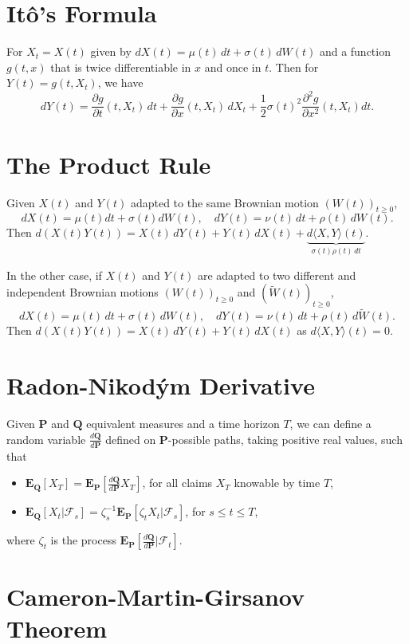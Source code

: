 \documentclass[twocolumn]{amsart}
\renewcommand{\P}{\mathbf{P}}
\newcommand{\Q}{\mathbf{Q}}
\newcommand{\EP}{\mathbf{E}_\mathbf{P}}
\newcommand{\EQ}{\mathbf{E}_\mathbf{Q}}
\newcommand{\F}{\mathcal{F}}
\newcommand{\QV}[1]{\langle#1\rangle}
\newcommand{\tW}{\widetilde W}
\begin{document}
\section*{It\^o's Formula}
For $X_t=X(t)$ given by $dX(t) = \mu(t)\,dt + \sigma(t)\,dW(t)$ and a function $g(t,x)$ that is twice differentiable in $x$ and once in $t$. Then for $Y(t) = g(t,X_t)$, we have
\[
dY(t) = \frac{\partial g}{\partial t}(t,X_t)\,dt + \frac{\partial g}{\partial x}(t,X_t)\,dX_t + \frac{1}{2} \sigma(t)^2 \frac{\partial ^2 g}{\partial x^2}(t,X_t)dt.
\]

\section*{The Product Rule}
Given $X(t)$ and $Y(t)$ adapted to the same Brownian motion $(W(t))_{t \ge 0}$,
\[
    dX(t) = \mu(t)dt +\sigma(t)dW(t), \quad
    dY(t) = \nu(t)\,dt + \rho(t)\,dW(t).
\]
Then $d(X(t) Y(t)) = X(t)\,d Y(t) + Y(t)\,dX(t) + \underbrace{d\QV{X,Y}(t)}_{\sigma(t) \rho(t)\,dt}$.

In the other case, if $X(t)$ and $Y(t)$ are adapted to two different and independent Brownian motions $(W(t))_{t \ge 0} $ and $(\tW(t))_{t \ge 0}$,
\[
    dX(t) =  \mu(t)\,dt + \sigma(t) \,dW(t), \quad
    dY(t) =  \nu(t)\,dt + \rho(t)\,d\tW(t).
\]
Then $d(X(t) Y(t)) = X(t) \,dY(t) + Y(t)\,dX(t)$ as $d\QV{X,Y}(t) = 0$.

\section*{Radon-Nikod\'ym Derivative}

Given $\P$ and $\Q$ equivalent measures and a time horizon $T$, we can define a random variable $\frac{d\Q}{d\P}$ defined on $\P$-possible paths, taking positive real values, such that
\begin{itemize}
    \item $\displaystyle \EQ[X_T] = \EP\left[\frac{d\Q}{d\P} X_T \right]$, for all claims $X_T$ knowable by time $T$,
    \item $\displaystyle \EQ[X_t | \F_s] = \zeta_s^{-1} \EP\left[\zeta_t X_t|\F_s\right]$, for $s \le t \le T$,
\end{itemize}
where $\zeta_t$ is the process $\EP[\frac{d \Q}{d \P} | \F_t]$.

\section*{Cameron-Martin-Girsanov Theorem}
\end{document}
